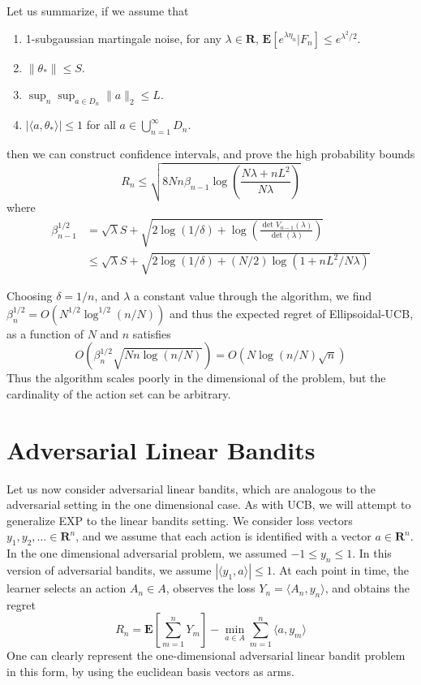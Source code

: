 Let us summarize, if we assume that
%
\begin{enumerate}
    \item 1-subgaussian martingale noise, for any $\lambda \in \mathbf{R}$, $\mathbf{E}[e^{\lambda \eta_n} | F_n] \leq e^{\lambda^2/2}$.
    \item $\| \theta_* \| \leq S$.
    \item $\sup_n \sup_{a \in D_n} \| a \|_2 \leq L$.
    \item $|\langle a, \theta_* \rangle| \leq 1$ for all $a \in \bigcup_{n = 1}^\infty D_n$.
\end{enumerate}
%
then we can construct confidence intervals, and prove the high probability bounds
%
\[ \hat{R_n} \leq \sqrt{8 Nn \beta_{n-1} \log \left( \frac{N\lambda + nL^2}{N \lambda} \right)} \]
%
where
%
\begin{align*}
    \beta_{n-1}^{1/2} &= \sqrt{\lambda} S + \sqrt{2 \log(1/\delta) + \log \left( \frac{\det V_{n-1}(\lambda)}{\det(\lambda)} \right)}\\
    &\leq \sqrt{\lambda} S + \sqrt{2 \log(1/\delta) + (N/2) \log(1 + nL^2/N\lambda)}
\end{align*}

Choosing $\delta = 1/n$, and $\lambda$ a constant value through the algorithm, we find $\beta_n^{1/2} = O(N^{1/2} \log^{1/2}(n/N))$ and thus the expected regret of Ellipsoidal-UCB, as a function of $N$ and $n$ satisfies
%
\[ O(\beta_n^{1/2} \sqrt{Nn \log(n/N)}) = O(N\log(n/N) \sqrt{n}) \]
%
Thus the algorithm scales poorly in the dimensional of the problem, but the cardinality of the action set can be arbitrary.

\section{Adversarial Linear Bandits}

Let us now consider adversarial linear bandits, which are analogous to the adversarial setting in the one dimensional case. As with UCB, we will attempt to generalize EXP to the linear bandits setting. We consider loss vectors $y_1, y_2, \dots \in \mathbf{R}^n$, and we assume that each action is identified with a vector $a \in \mathbf{R}^n$. In the one dimensional adversarial problem, we assumed $-1 \leq y_n \leq 1$. In this version of adversarial bandits, we assume $|\langle y_1, a \rangle| \leq 1$. At each point in time, the learner selects an action $A_n \in A$, observes the loss $Y_n = \langle A_n, y_n \rangle$, and obtains the regret
%
\[ R_n = \mathbf{E} \left[ \sum_{m = 1}^n Y_m \right] - \min_{a \in A} \sum_{m = 1}^n \langle a, y_m \rangle \]
%
One can clearly represent the one-dimensional adversarial linear bandit problem in this form, by using the euclidean basis vectors as arms.

